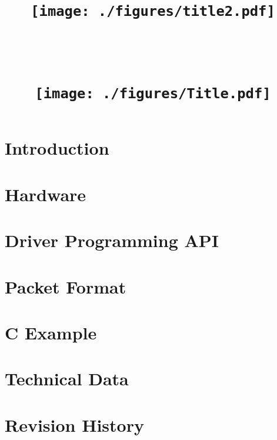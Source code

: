 \documentclass[11pt,notitlepage]{scrreprt}
\title{
	\ \\
 	\begin{center}
		\texttt{[image: ./figures/title2.pdf]}
	\end{center}
	\ \\
	\ \\
	\texttt{[image: ./figures/Title.pdf]}
}
\subtitle{
		\ \\
		\ \\
		\begin{center}
			\texttt{[image: ./figures/Ndigo5G-3Dlowres.jpg]}
		\end{center}
}
\date{}}
\author{}
\begin{document}
	\newpage
	\maketitle
	\thispagestyle{empty}
	\newpage
	\tableofcontents
	\clearpage
	\pagestyle{fancy}
	\chapter{Introduction}
		
	\chapter{Hardware}
		
	\chapter{Driver Programming API}
		
	\chapter{Packet Format\label{cp:packetformat}}
		
	\chapter{C Example}
		
	\chapter{Technical Data}
		
		
	\chapter{Revision History}
		
		
		
\end{document}
